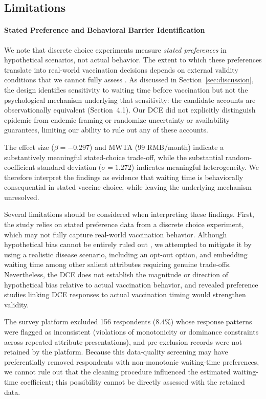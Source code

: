 \documentclass[12pt]{article}
\begin{document}
\subsection{Limitations}\label{sec:limitations}

\paragraph{Stated Preference and Behavioral Barrier Identification}

We note that discrete choice experiments measure \textit{stated preferences} in hypothetical scenarios, not actual behavior. The extent to which these preferences translate into real-world vaccination decisions depends on external validity conditions that we cannot fully assess \parencite{Hensher2015}. As discussed in Section~\ref{sec:discussion}, the design identifies sensitivity to waiting time before vaccination but not the psychological mechanism underlying that sensitivity: the candidate accounts are observationally equivalent (Section~4.1). Our DCE did not explicitly distinguish epidemic from endemic framing or randomize uncertainty or availability guarantees, limiting our ability to rule out any of these accounts.

The effect size ($\beta = -0.297$) and MWTA (99 RMB/month) indicate a substantively meaningful stated-choice trade-off, while the substantial random-coefficient standard deviation ($\sigma = 1.272$) indicates meaningful heterogeneity. We therefore interpret the findings as evidence that waiting time is behaviorally consequential in stated vaccine choice, while leaving the underlying mechanism unresolved.

Several limitations should be considered when interpreting these findings. First, the study relies on stated preference data from a discrete choice experiment, which may not fully capture real-world vaccination behavior. Although hypothetical bias cannot be entirely ruled out \parencite{Murphy2005}, we attempted to mitigate it by using a realistic disease scenario, including an opt-out option, and embedding waiting time among other salient attributes requiring genuine trade-offs. Nevertheless, the DCE does not establish the magnitude or direction of hypothetical bias relative to actual vaccination behavior, and revealed preference studies linking DCE responses to actual vaccination timing would strengthen validity.

The survey platform excluded 156 respondents (8.4\%) whose response patterns were flagged as inconsistent (violations of monotonicity or dominance constraints across repeated attribute presentations), and pre-exclusion records were not retained by the platform. Because this data-quality screening may have preferentially removed respondents with non-monotonic waiting-time preferences, we cannot rule out that the cleaning procedure influenced the estimated waiting-time coefficient; this possibility cannot be directly assessed with the retained data.
\end{document}
